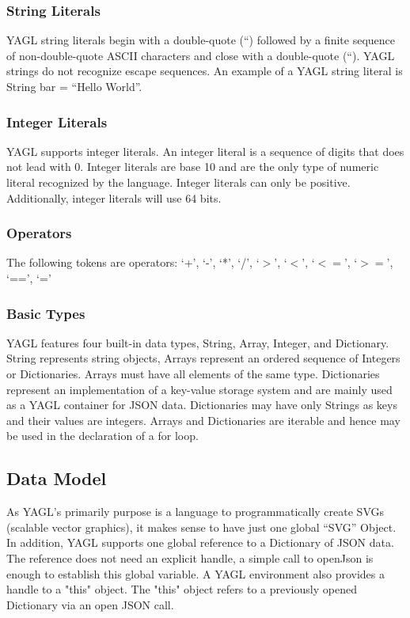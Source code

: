 \documentclass[12pt]{article}
\begin{document}
\subsubsection{String Literals}
YAGL string literals begin with a double-quote (“) followed by a finite sequence of non-double-quote ASCII characters and close with a double-quote (“). YAGL strings do not recognize escape sequences. An example of a YAGL string literal is String bar = “Hello World”.

\subsubsection{Integer Literals}
YAGL supports integer literals.  An integer literal is a sequence of digits that does not lead with 0. Integer literals are base 10 and are the only type of numeric literal recognized by the language. Integer literals can only be positive.  Additionally, integer literals will use 64 bits.

\subsubsection{Operators}
The following tokens are operators:
‘+’, ‘-’, ‘*’, ‘/’, ‘$>$’, ‘$<$’, ‘$<=$’, ‘$>=$’, ‘==’, ‘=’

\subsubsection{Basic Types}
YAGL features four built-in data types, String, Array, Integer, and Dictionary. String represents string objects, Arrays represent an ordered sequence of Integers or Dictionaries. Arrays must have all elements of the same type.  Dictionaries represent an implementation of a key-value storage system and are mainly used as a YAGL container for JSON data. Dictionaries may have only Strings as keys and their values are integers. Arrays and Dictionaries are iterable and hence may be used in the declaration of a for loop. 

\subsection{Data Model}
As YAGL’s primarily purpose is a language to programmatically create SVGs (scalable vector graphics), it makes sense to have just one global “SVG” Object. In addition, YAGL supports one global reference to a Dictionary of JSON data. The reference does not need an explicit handle, a simple call to openJson is enough to establish this global variable. A YAGL environment also provides a handle to a "this" object. The "this" object refers to a previously opened Dictionary via an open JSON call.
\end{document}
